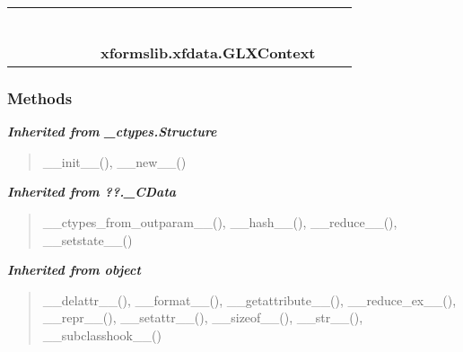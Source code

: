     \label{xformslib:xfdata:GLXContext}
\begin{tabular}{cccccccccc}
\multicolumn{2}{r}{\settowidth{\BCL}{object}\multirow{2}{\BCL}{object}}
&&
&&
&&
  \\\cline{3-3}
  &&\multicolumn{1}{c|}{}
&&
&&
&&
  \\
\multicolumn{4}{r}{\settowidth{\BCL}{??.\_CData}\multirow{2}{\BCL}{??.\_CData}}
&&
&&
  \\\cline{5-5}
  &&&&\multicolumn{1}{c|}{}
&&
&&
  \\
\multicolumn{6}{r}{\settowidth{\BCL}{\_ctypes.Structure}\multirow{2}{\BCL}{\_ctypes.Structure}}
&&
  \\\cline{7-7}
  &&&&&&\multicolumn{1}{c|}{}
&&
  \\
&&&&&&\multicolumn{2}{l}{\textbf{xformslib.xfdata.GLXContext}}
\end{tabular}



  \subsubsection{Methods}


\large{\textbf{\textit{Inherited from \_ctypes.Structure}}}

\begin{quote}
\_\_init\_\_(), \_\_new\_\_()
\end{quote}

\large{\textbf{\textit{Inherited from ??.\_CData}}}

\begin{quote}
\_\_ctypes\_from\_outparam\_\_(), \_\_hash\_\_(), \_\_reduce\_\_(), \_\_setstate\_\_()
\end{quote}

\large{\textbf{\textit{Inherited from object}}}

\begin{quote}
\_\_delattr\_\_(), \_\_format\_\_(), \_\_getattribute\_\_(), \_\_reduce\_ex\_\_(), \_\_repr\_\_(), \_\_setattr\_\_(), \_\_sizeof\_\_(), \_\_str\_\_(), \_\_subclasshook\_\_()
\end{quote}


